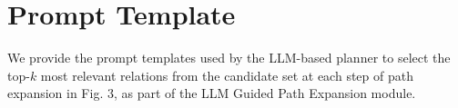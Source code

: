 


\section{Prompt Template}

We provide the prompt templates used by the LLM-based planner to select the top-$k$ most relevant relations from the candidate set at each step of path expansion in Fig. 3, as part of the LLM Guided Path Expansion module.

